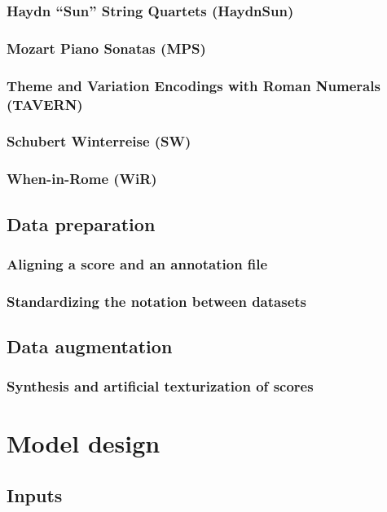 \documentclass[12pt]{article}
\begin{document}
\subsubsection{Haydn ``Sun'' String Quartets (HaydnSun)}
\subsubsection{Mozart Piano Sonatas (MPS)}
\subsubsection{Theme and Variation Encodings with Roman Numerals (TAVERN)}
\subsubsection{Schubert Winterreise (SW)}
\subsubsection{When-in-Rome (WiR)}
\subsection{Data preparation}
\subsubsection{Aligning a score and an annotation file}
\subsubsection{Standardizing the notation between datasets}
\subsection{Data augmentation}
\subsubsection{Synthesis and artificial texturization of scores}

\section{Model design}
\subsection{Inputs}
\end{document}
